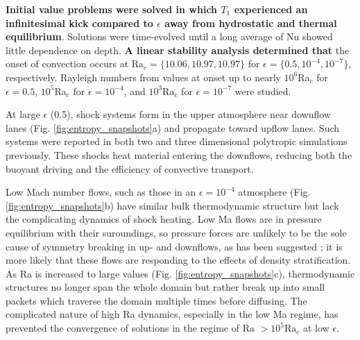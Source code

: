 \documentclass[aps, prl, twocolumn, nofootinbib, groupedaddress, amsfonts, amssymb, amsmath]{revtex4-1}
\begin{document}
\textbf{Initial value problems were solved in which $T_1$ experienced an infinitesimal kick compared to $\epsilon$
away from hydrostatic and thermal equilibrium}.
Solutions were time-evolved until a long average of Nu showed little
dependence on depth. \textbf{A linear stability analysis determined that} the onset of convection
occurs at $\text{Ra}_c = \{10.06, 10.97, 10.97\}$ for $\epsilon = \{0.5, 10^{-4}, 10^{-7}\}$, respectively.  Rayleigh
numbers from values at onset up to nearly $10^6$Ra$_c$ for $\epsilon = 0.5$, $10^5$Ra$_c$ for $\epsilon = 10^{-4}$,
and $10^3$Ra$_c$ for $\epsilon = 10^{-7}$ were studied.  

At large $\epsilon$ (0.5), shock systems form in the upper atmosphere near downflow lanes 
(Fig. \ref{fig:entropy_snapshots}a) and propagate toward upflow lanes.  
Such systems were reported in
both two \cite{cattaneo&all1990} and three \cite{malagoli&all1990} dimensional polytropic simulations previously.
These shocks heat material entering the downflows, reducing both the
buoyant driving and the efficiency of convective transport.

Low Mach number flows, such as those in an $\epsilon = 10^{-4}$ atmosphere (Fig. \ref{fig:entropy_snapshots}b)
have similar bulk thermodynamic structure but lack the complicating dynamics of shock heating. 
Low Ma flows are in pressure equilibrium with their suroundings, so
pressure forces are unlikely to be the sole cause of symmetry breaking in up- and downflows, as has been suggested
\cite{hurlburt&all1984};  it is more likely that these flows are responding to 
the effects of density stratification.
As Ra is increased to large values (Fig. \ref{fig:entropy_snapshots}c), thermodynamic structures 
no longer span the whole domain but rather break up into small packets which traverse the domain multiple
times before diffusing.  
The complicated nature of high Ra dynamics, especially in the low Ma regime,
has prevented the convergence of solutions in the regime of 
$\text{Ra }> 10^5\text{Ra}_c$ at low $\epsilon$.
\end{document}
